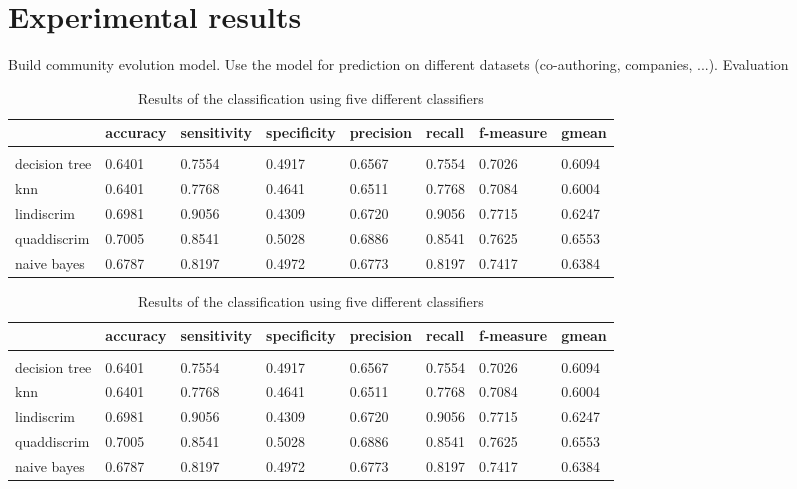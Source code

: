 \documentclass{article} %
\begin{document}
\section{Experimental results}
Build community evolution model.
Use the model for prediction on different datasets (co-authoring, companies, ...). Evaluation

\begin{table}[h]
\caption{Results of the classification using five different classifiers}
\label{classification}
\begin{center}
\begin{tabular}{@{}llllllll@{}}
                 & accuracy & sensitivity & specificity & precision & recall & f-measure & gmean \\
                 \hline \\
decision tree    & 0.6401   & 0.7554      & 0.4917      & 0.6567    & 0.7554 & 0.7026     & 0.6094 \\
knn              & 0.6401   & 0.7768      & 0.4641      & 0.6511    & 0.7768 & 0.7084     & 0.6004 \\
lindiscrim       & 0.6981   & 0.9056      & 0.4309      & 0.6720    & 0.9056 & 0.7715     & 0.6247 \\
quaddiscrim      & 0.7005   & 0.8541      & 0.5028      & 0.6886    & 0.8541 & 0.7625     & 0.6553 \\
naive bayes      & 0.6787   & 0.8197      & 0.4972      & 0.6773    & 0.8197 & 0.7417     & 0.6384 \\  
\end{tabular}
\end{center}
\end{table}

\begin{table}[h]
\caption{Results of the classification using five different classifiers}
\label{classification}
\begin{center}
\begin{tabular}{@{}llllllll@{}}
                 & accuracy & sensitivity & specificity & precision & recall & f-measure & gmean \\
                 \hline \\
decision tree    & 0.6401   & 0.7554      & 0.4917      & 0.6567    & 0.7554 & 0.7026     & 0.6094 \\
knn              & 0.6401   & 0.7768      & 0.4641      & 0.6511    & 0.7768 & 0.7084     & 0.6004 \\
lindiscrim       & 0.6981   & 0.9056      & 0.4309      & 0.6720    & 0.9056 & 0.7715     & 0.6247 \\
quaddiscrim      & 0.7005   & 0.8541      & 0.5028      & 0.6886    & 0.8541 & 0.7625     & 0.6553 \\
naive bayes      & 0.6787   & 0.8197      & 0.4972      & 0.6773    & 0.8197 & 0.7417     & 0.6384 \\  
\end{tabular}
\end{center}
\end{table}
\end{document}

